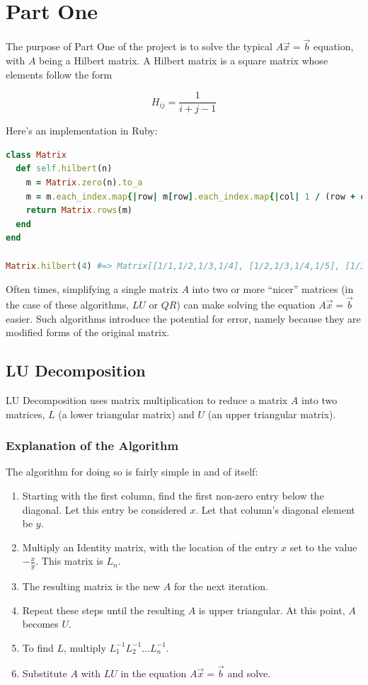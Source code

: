 \documentclass[letterpaper,12pt]{article}
\begin{document}
\newpage
\section{Part One}


The purpose of Part One of the project is to solve the typical
$A\vec{x} = \vec{b}$ equation, with $A$ being a Hilbert matrix.
A Hilbert matrix is a square matrix whose elements follow the form

\[H_{ij} = \frac{1}{i + j - 1}\]

Here's an implementation in Ruby:

\lstset{caption=Hilbert Matrix Implementation}
\begin{lstlisting}[language=ruby]
class Matrix
  def self.hilbert(n)
    m = Matrix.zero(n).to_a
    m = m.each_index.map{|row| m[row].each_index.map{|col| 1 / (row + col + 1)}}
    return Matrix.rows(m)
  end
end

Matrix.hilbert(4) #=> Matrix[[1/1,1/2,1/3,1/4], [1/2,1/3,1/4,1/5], [1/3,1/4,1/5,1/6], [1/4,1/5,1/6,1/7]]
\end{lstlisting}

Often times, simplifying a single matrix $A$ into two or more ``nicer'' matrices
(in the case of these algorithms, $LU$ or $QR$) can make solving the equation
$A\vec{x}=\vec{b}$ easier.
Such algorithms introduce the potential for error, namely because they are
modified forms of the original matrix.

\subsection{LU Decomposition}

LU Decomposition uses matrix multiplication to reduce a matrix $A$ into two
matrices, $L$ (a lower triangular matrix) and $U$ (an upper triangular matrix).

\subsubsection{Explanation of the Algorithm}

The algorithm for doing so is fairly simple in and of itself:

\begin{enumerate}
\item Starting with the first column, find the first non-zero entry below the
  diagonal. Let this entry be considered $x$. Let that column's diagonal element
  be $y$.
\item Multiply an Identity matrix, with the location of the entry $x$ set to the
  value $-\frac{x}{y}$. This matrix is $L_n$.
\item The resulting matrix is the new $A$ for the next iteration.
\item Repeat these steps until the resulting $A$ is upper triangular.
  At this point, $A$ becomes $U$.
\item To find $L$, multiply $L_1^{-1}L_2^{-1} ... L_n^{-1}$.
\item Substitute $A$ with $LU$ in the equation $A\vec{x}=\vec{b}$ and solve.
\end{enumerate}
\end{document}
